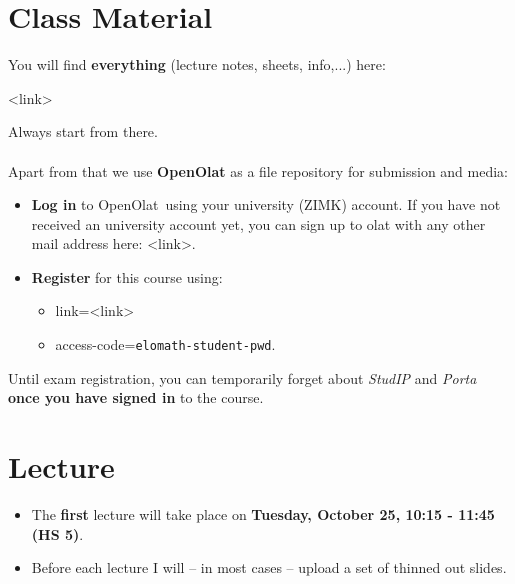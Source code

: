 \documentclass{article}
\def\firstlecture{{\color{black} \bfseries Tuesday, October 25, 10:15 - 11:45 (HS 5)}}
\def\slides{<link>}
\def\olatAccessPwd{\texttt{elomath-student-pwd}}
\def\exerciseUploadRepName{OpenOlat}
\def\exerciseUploadRepLink{<link>}
\def\olatSignUp{<link>}
\begin{document}
\section{Class Material} \label{sec:classMaterial}
You will find \textbf{everything} (lecture notes, sheets, info,...) here:
\begin{center}
	\slides
\end{center}
Always start from there.\\
~\\
Apart from that we use \textbf{\exerciseUploadRepName} as a file repository for submission and media:
\begin{itemize}
	\item \textbf{Log in} to \exerciseUploadRepName\ using your university (ZIMK) account. If you have not received an university account yet, you can sign up to olat with any other mail address here: \olatSignUp.
	\item \textbf{Register} for this course using:
	\begin{itemize}
		\item link=\exerciseUploadRepLink\
		\item access-code=\olatAccessPwd.
	\end{itemize}  
\end{itemize}
Until exam registration, you can temporarily forget about \textit{StudIP} and \textit{Porta} \textbf{once you have signed in} to the course.
\section{Lecture}
\begin{itemize}
	\item The \textbf{first} lecture will take place on {\firstlecture}.
	\item Before each lecture I will -- in most cases -- upload a set of thinned out slides.	
\end{itemize}
\end{document}
